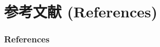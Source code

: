 \section{参考文献 (References)}

\begin{frame}[allowframebreaks]
    \frametitle{References}
    
    
\end{frame}
